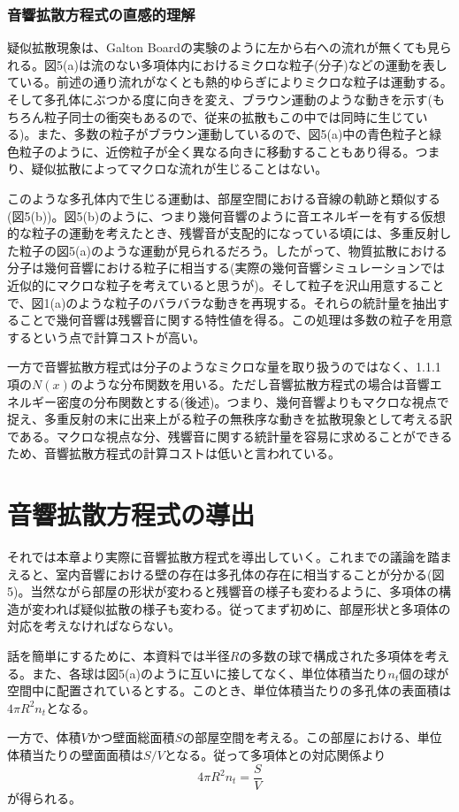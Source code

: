 \documentclass[dvipdfmx, 9pt, a4paper]{jsarticle}
\begin{document}
\subsubsection{音響拡散方程式の直感的理解}
疑似拡散現象は、Galton Boardの実験のように左から右への流れが無くても見られる。図5(a)は流のない多項体内におけるミクロな粒子(分子)などの運動を表している。前述の通り流れがなくとも熱的ゆらぎによりミクロな粒子は運動する。そして多孔体にぶつかる度に向きを変え、ブラウン運動のような動きを示す(もちろん粒子同士の衝突もあるので、従来の拡散もこの中では同時に生じている)。また、多数の粒子がブラウン運動しているので、図5(a)中の青色粒子と緑色粒子のように、近傍粒子が全く異なる向きに移動することもあり得る。つまり、疑似拡散によってマクロな流れが生じることはない。\par
このような多孔体内で生じる運動は、部屋空間における音線の軌跡と類似する(図5(b))。図5(b)のように、つまり幾何音響のように音エネルギーを有する仮想的な粒子の運動を考えたとき、残響音が支配的になっている頃には、多重反射した粒子の図5(a)のような運動が見られるだろう。したがって、物質拡散における分子は幾何音響における粒子に相当する(実際の幾何音響シミュレーションでは近似的にマクロな粒子を考えていると思うが)。そして粒子を沢山用意することで、図1(a)のような粒子のバラバラな動きを再現する。それらの統計量を抽出することで幾何音響は残響音に関する特性値を得る。この処理は多数の粒子を用意するという点で計算コストが高い。\par
一方で音響拡散方程式は分子のようなミクロな量を取り扱うのではなく、1.1.1項の$N(x)$のような分布関数を用いる。ただし音響拡散方程式の場合は音響エネルギー密度の分布関数とする(後述)。つまり、幾何音響よりもマクロな視点で捉え、多重反射の末に出来上がる粒子の無秩序な動きを拡散現象として考える訳である。マクロな視点な分、残響音に関する統計量を容易に求めることができるため、音響拡散方程式の計算コストは低いと言われている。

\section{音響拡散方程式の導出}
それでは本章より実際に音響拡散方程式を導出していく。これまでの議論を踏まえると、室内音響における壁の存在は多孔体の存在に相当することが分かる(図5)。当然ながら部屋の形状が変わると残響音の様子も変わるように、多項体の構造が変われば疑似拡散の様子も変わる。従ってまず初めに、部屋形状と多項体の対応を考えなければならない。\par
話を簡単にするために、本資料では半径$R$の多数の球で構成された多項体を考える。また、各球は図5(a)のように互いに接してなく、単位体積当たり$n_t$個の球が空間中に配置されているとする。このとき、単位体積当たりの多孔体の表面積は$4\pi R^2n_t$となる。\par
一方で、体積$V$かつ壁面総面積$S$の部屋空間を考える。この部屋における、単位体積当たりの壁面面積は$S/V$となる。従って多項体との対応関係より
\begin{equation}
4\pi R^2n_t=\frac{S}{V}
\end{equation}
が得られる。
\end{document}
